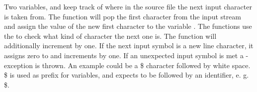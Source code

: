 Two variables,   and   keep track of where in the source file the next input character is taken from. The function  will pop the first character from the input stream and assign the value of the new first character to the variable . The  functions use the  to check what kind of character the next one is.
The  function will additionally increment  by one. If the next input symbol is a new line character, it assigns zero to   and increments  by one. If an unexpected input symbol is met a -exception is thrown. An example could be a \$ character followed by white space. \$ is used as prefix for variables, and expects to be followed by an identifier, e. g. \$.
 

